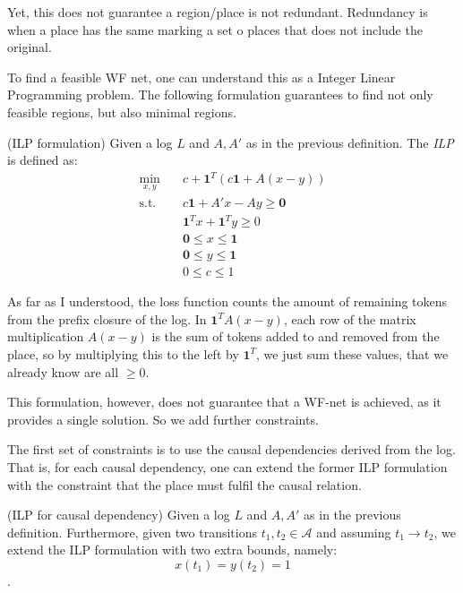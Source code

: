 \documentclass[a4paper]{report}
\begin{document}
Yet, this does not guarantee a region/place is not redundant. Redundancy is when a place has the same marking a set o places that does not include the original.

To find a feasible WF net, one can understand this as a Integer Linear Programming problem. The following formulation guarantees to find not only feasible regions, but also minimal regions.

\begin{definition}
    (ILP formulation) Given a log $L$ and $A, A'$ as in the previous definition. The \emph{ILP} is defined as:
    \begin{equation}
        \begin{aligned}
	    \min_{x,y} \quad & c + \bm{1}^{T}\left( c \bm{1} + A(x-y) \right) \\
	    \text{s.t.} \quad & c \bm{1} + A'x - Ay \ge \bm{0} \\
			     & \bm{1}^{T}x + \bm{1}^{T}y \ge 0 \\
			     & \bm{0} \le x\le \bm{1} \\
			     & \bm{0} \le y\le \bm{1} \\
			     & 0 \le c\le 1
        \end{aligned}
    \end{equation}
\end{definition}

As far as I understood, the loss function counts the amount of remaining tokens from the prefix closure of the log. In $\bm{1}^{T}A(x-y)$, each row of the matrix multiplication $A(x-y)$ is the sum of tokens added to and removed from the place, so by multiplying this to the left by $\bm{1}^{T}$, we just sum these values, that we already know are all $\ge 0$.

This formulation, however, does not guarantee that a WF-net is achieved, as it provides a single solution. So we add further constraints.

The first set of constraints is to use the causal dependencies derived from the log. That is, for each causal dependency, one can extend the former ILP formulation with the constraint that the place must fulfil the causal relation.

\begin{definition}
    (ILP for causal dependency) Given a log $L$ and $A, A'$ as in the previous definition. Furthermore, given two transitions $t_1,t_2\in \mathcal{A}$ and assuming $t_1\to t_2$, we extend the ILP formulation with two extra bounds, namely: \[
	x(t_1)=y(t_2)=1
    \].
\end{definition}
\end{document}
